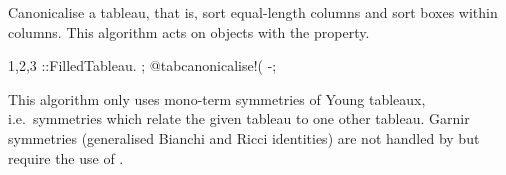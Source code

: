 
Canonicalise a tableau, that is, sort equal-length columns and sort
boxes within columns. This algorithm acts on objects with
the  property.
\begin{screen}{1,2,3}
\tableau{#}::FilledTableau.
;
@tabcanonicalise!(%
-;
\end{screen}
This algorithm only uses mono-term symmetries of Young tableaux,
i.e.~symmetries which relate the given tableau to one other
tableau. Garnir symmetries (generalised Bianchi and Ricci identities)
are not handled by  but require the use
of .


